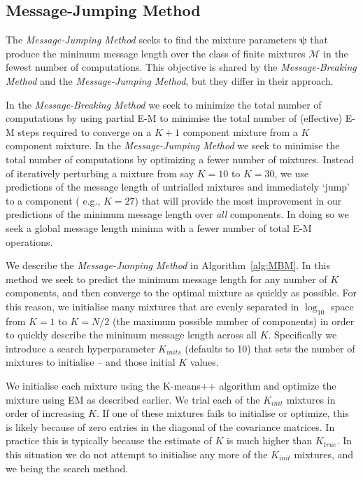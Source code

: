 \documentclass{elsarticle}
\newcommand{\vect}[1]{\boldsymbol{\mathbf{#1}}}
\renewcommand{\vec}[1]{\vect{#1}}
\begin{document}
\subsection{Message-Jumping Method}

The \emph{Message-Jumping Method} seeks to find the mixture parameters $\vec\psi$ that produce the minimum message length over the class of finite mixtures $\vec{\mathcal{M}}$ in the fewest number of computations. This objective is shared by the \emph{Message-Breaking Method} and the \emph{Message-Jumping Method}, but they differ in their approach.

In the \emph{Message-Breaking Method} we seek to minimize the total number of computations by using  partial E-M to minimise the total number of (effective) E-M steps
required to converge on a $K+1$ component mixture from a $K$ component mixture.
In the \emph{Message-Jumping Method} we seek to minimise the total number
of computations by optimizing a fewer number of mixtures. Instead of iteratively
perturbing a mixture from say $K = 10$ to $K = 30$, we use predictions of the
message length of untrialled mixtures and immediately `jump' to a component (
e.g., $K = 27$) that will provide the most improvement in our predictions of the
minimum message length over \emph{all} components. In doing so we seek a global 
message length minima with a fewer number of total E-M operations.


We describe the \emph{Message-Jumping Method} in Algorithm~\ref{alg:MBM}. In this
method we seek to predict the minimum message length for any number of $K$ components,
and then converge to the optimal mixture as quickly as possible. For this reason,
we initialise many mixtures that are evenly separated in $\log_{10}$ space from
$K = 1$ to $K = N/2$ (the maximum possible number of components) in order to
quickly describe the minimum message length across all $K$. Specifically we
introduce a search hyperparameter $K_{inits}$ (defaults to 10) that sets the
number of mixtures to initialise -- and those initial $K$ values. 


We initialise each mixture using the K-means++ algorithm\cite{kmeanspp} and
optimize the mixture using EM as described earlier. We trial each of the $K_{init}$
mixtures in order of increasing $K$. If one of these mixtures fails to initialise
or optimize, this is likely because of zero entries in the diagonal of the covariance
matrices. In practice this is typically because
the estimate of $K$ is much higher than $K_{true}$. In this situation we do not attempt
to initialise any more of the $K_{init}$ mixtures, and we being the search method.
\end{document}
